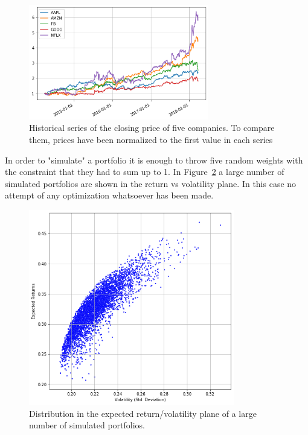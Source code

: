 \begin{figure}[htb]
\centering
\includegraphics[width=0.7\textwidth]{figures/portfolio_sample}
\caption{Historical series of the closing price of five companies. To compare them, prices have been normalized to the first value in each series}
\label{fig:stocks}
\end{figure}
    
In order to "simulate" a portfolio it is enough to throw five random weights with the constraint that they had to sum up to 1. 
In Figure~\ref{fig:mc_portfolio} a large number of simulated portfolios are shown in the return vs volatility plane. 
In this case no attempt of any optimization whatsoever has been made.

\begin{figure}[hbt]
\centering
\includegraphics[width=0.8\textwidth]{figures/return_variance}
\caption{Distribution in the expected return/volatility plane of a large number of simulated portfolios.}
\label{fig:mc_portfolio}
\end{figure}

